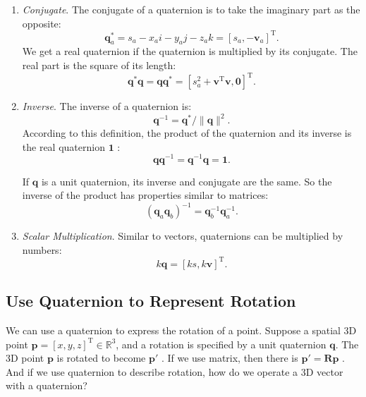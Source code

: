 \begin{enumerate}
    \item { \emph {Conjugate}}. The conjugate of a quaternion is to take the imaginary part as the opposite:
    \begin{equation}
    \mathbf{q}_a ^ * = s_a - x_ai - y_aj - z_ak = [s_a, - \mathbf{v}_a] ^ \mathrm{T}.
    \end{equation}
    We get a real quaternion if the quaternion is multiplied by its conjugate. The real part is the square of its length:
    \begin{equation}
    \mathbf{q}^* \mathbf{q} = \mathbf{q} \mathbf{q}^* = [s_a^2+\mathbf{v}^\mathrm{T} \mathbf{v}, \mathbf{0} ]^\mathrm{T}.
    \end{equation}
    
    \item { \emph{Inverse}}. The inverse of a quaternion is:
    \begin{equation}
    \label{eq:quaternionInverse}
    \mathbf{q} ^ { - 1 } = \mathbf{q} ^ * / \| \mathbf{q} \| ^ 2 .       
    \end{equation}
    According to this definition, the product of the quaternion and its inverse is the real quaternion $ \mathbf {1} $ :
    \begin{equation}
    \mathbf{q} \mathbf{q}^{-1} = \mathbf{q}^{-1} \mathbf{q} = \mathbf{1}.
    \end{equation}
    
    If $ \mathbf{q} $ is a unit quaternion, its inverse and conjugate are the same. So the inverse of the product has properties similar to matrices:
    \begin{equation}
    \left( \mathbf{q}_a \mathbf{q}_b \right)^{-1} = \mathbf{q}_b^{-1} \mathbf{q}_a^{-1}.
    \end{equation}
    
    \item { \emph {Scalar Multiplication}.} Similar to vectors, quaternions can be multiplied by numbers:
    \begin{equation}
    k \mathbf{q} = \left[ ks, k\mathbf{v} \right]^\mathrm{T}.
    \end{equation}
\end{enumerate}

\subsection{Use Quaternion to Represent Rotation}

We can use a quaternion to express the rotation of a point. Suppose a spatial 3D point $ \bm{p} = [x,y,z]^\mathrm{T} \in  \mathbb {R}^3$, and a rotation is specified by a unit quaternion $ \bm{q}$. The 3D point $\bm{p}$ is rotated to become $\bm{p}'$ . If we use matrix, then there is $ \bm{p}'= \bm{R} \bm{p} $ . And if we use quaternion to describe rotation, how do we operate a 3D vector with a quaternion? 


